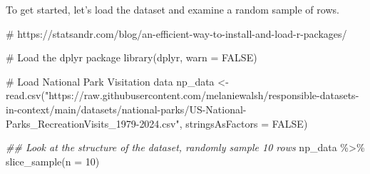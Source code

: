 \documentclass[
  letterpaper,
  DIV=11,
  numbers=noendperiod]{scrartcl}
\newenvironment{Shaded}{\begin{snugshade}}{\end{snugshade}}
\newcommand{\AttributeTok}[1]{\textcolor[rgb]{0.40,0.45,0.13}{#1}}
\newcommand{\CommentTok}[1]{\textcolor[rgb]{0.37,0.37,0.37}{#1}}
\newcommand{\ConstantTok}[1]{\textcolor[rgb]{0.56,0.35,0.01}{#1}}
\newcommand{\DecValTok}[1]{\textcolor[rgb]{0.68,0.00,0.00}{#1}}
\newcommand{\DocumentationTok}[1]{\textcolor[rgb]{0.37,0.37,0.37}{\textit{#1}}}
\newcommand{\FunctionTok}[1]{\textcolor[rgb]{0.28,0.35,0.67}{#1}}
\newcommand{\NormalTok}[1]{\textcolor[rgb]{0.00,0.23,0.31}{#1}}
\newcommand{\OtherTok}[1]{\textcolor[rgb]{0.00,0.23,0.31}{#1}}
\newcommand{\SpecialCharTok}[1]{\textcolor[rgb]{0.37,0.37,0.37}{#1}}
\newcommand{\StringTok}[1]{\textcolor[rgb]{0.13,0.47,0.30}{#1}}
\begin{document}
To get started, let's load the dataset and examine a random sample of
rows.

\begin{Shaded}
\begin{Highlighting}[]
\CommentTok{\# https://statsandr.com/blog/an{-}efficient{-}way{-}to{-}install{-}and{-}load{-}r{-}packages/}

\CommentTok{\# Load the dplyr package}
\FunctionTok{library}\NormalTok{(dplyr, }\AttributeTok{warn =} \ConstantTok{FALSE}\NormalTok{)}

\CommentTok{\# Load National Park Visitation data}
\NormalTok{np\_data }\OtherTok{\textless{}{-}} \FunctionTok{read.csv}\NormalTok{(}\StringTok{"https://raw.githubusercontent.com/melaniewalsh/responsible{-}datasets{-}in{-}context/main/datasets/national{-}parks/US{-}National{-}Parks\_RecreationVisits\_1979{-}2024.csv"}\NormalTok{, }\AttributeTok{stringsAsFactors =} \ConstantTok{FALSE}\NormalTok{)}

\DocumentationTok{\#\# Look at the structure of the dataset, randomly sample 10 rows}
\NormalTok{np\_data }\SpecialCharTok{\%\textgreater{}\%} \FunctionTok{slice\_sample}\NormalTok{(}\AttributeTok{n =} \DecValTok{10}\NormalTok{)}
\end{Highlighting}
\end{Shaded}
\end{document}
